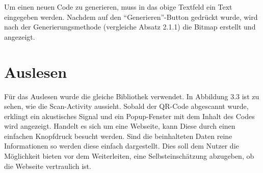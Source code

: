 \documentclass[12pt,					%
							 oneside,			%
							 a4paper,			%
							 halfparskip,		%
							 liststotoc,			%
							 bibtotoc,			%
							 fleqn,				%
							 pointlessnumbers]	%
							 {scrreprt}
\begin{document}
Um einen neuen Code zu generieren, muss in das obige Textfeld ein Text eingegeben werden. Nachdem auf den ``Generieren''-Button gedrückt wurde, wird nach der Generierungsmethode (vergleiche Absatz 2.1.1) die Bitmap erstellt und angezeigt.
\newpage

\section{Auslesen}
Für das Auslesen wurde die gleiche Bibliothek verwendet. In Abbildung 3.3 ist zu sehen, wie die Scan-Activity aussieht. Sobald der QR-Code abgescannt wurde, erklingt ein akustisches Signal und ein Popup-Fenster mit dem Inhalt des Codes wird angezeigt. Handelt es sich um eine Webseite, kann Diese durch einen einfachen Knopfdruck besucht werden. Sind die beinhalteten Daten reine Informationen so werden diese einfach dargestellt. Dies soll dem Nutzer die Möglichkeit bieten vor dem Weiterleiten, eine Selbsteinschätzung abzugeben, ob die Webseite vertraulich ist.
\end{document}
